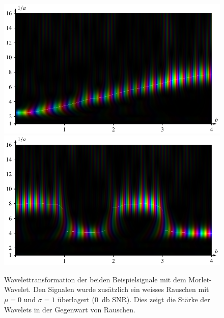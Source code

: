 \begin{figure}
	\centering
	\includegraphics[width=\linewidth, keepaspectratio]{papers/complex/images/add_nc_chirp_haar.pdf}
	\includegraphics[width=\linewidth, keepaspectratio]{papers/complex/images/add_nc_square_haar.pdf}
	\caption{Wavelettransformation der beiden Beispielsignale mit dem Morlet-Wavelet. 
		Den Signalen wurde zusätzlich ein weisses Rauschen mit $\mu = 0$ und $\sigma = 1$ überlagert (\SI{0}{\decibel} SNR).
		Dies zeigt die Stärke der Wavelets in der Gegenwart von Rauschen.}
\end{figure}
